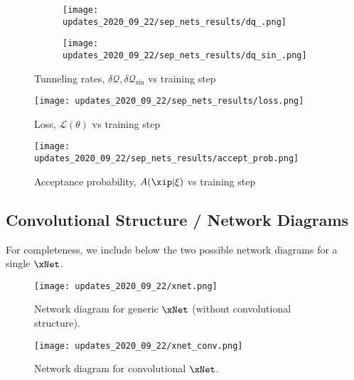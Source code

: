 %
\begin{figure}[htpb]
  \centering
  \begin{subfigure}[htpb]{\textwidth}
    \texttt{[image: updates\_2020\_09\_22/sep\_nets\_results/dq\_.png]}
  \end{subfigure}
  \begin{subfigure}[htpb]{\textwidth}
    \texttt{[image: updates\_2020\_09\_22/sep\_nets\_results/dq\_sin\_.png]}
  \end{subfigure}
  \caption{Tunneling rates, \(\delta \mathcal{Q}, \delta\mathcal{Q}_{\sin}\)
  vs training step}
\end{figure}
%
\begin{figure}[htpb]
  \centering
  \texttt{[image: updates\_2020\_09\_22/sep\_nets\_results/loss.png]}
  \caption{Loss, \(\mathcal{L}(\theta)\) vs training step} 
\end{figure}
%
\begin{figure}[htpb]
  \centering
  \texttt{[image: updates\_2020\_09\_22/sep\_nets\_results/accept\_prob.png]}
  \caption{Acceptance probability, \(A(\xip|\xi)\) vs training step} 
\end{figure}
%

\clearpage
\subsection{Convolutional Structure / Network Diagrams}
For completeness, we include below the two possible network diagrams for a
single \(\xNet\).

\begin{figure}[htpb]
  \centering
  \texttt{[image: updates\_2020\_09\_22/xnet.png]}
  \caption{Network diagram for generic \(\xNet\) (without convolutional
  structure).}
\end{figure}
%
\begin{figure}[htpb]
  \centering
  \texttt{[image: updates\_2020\_09\_22/xnet\_conv.png]}
  \caption{Network diagram for convolutional \(\xNet\).}
\end{figure}
